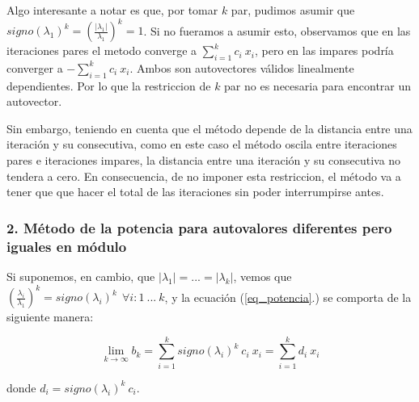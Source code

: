 \vspace{1em}
Algo interesante a notar es que, por tomar $k$ par, pudimos asumir que $signo(\lambda_1)^k = (\frac{|\lambda_{1}|}{\lambda_{1}})^k = 1$. Si no fueramos a asumir esto, observamos que en las iteraciones pares el metodo converge a $\sum_{i=1}^{k} c_i\ x_i$, pero en las impares podría converger a $-\sum_{i=1}^{k} c_i\ x_i$. Ambos son autovectores válidos linealmente dependientes. Por lo que la restriccion de $k$ par no es necesaria para encontrar un autovector.

Sin embargo, teniendo en cuenta que el método depende de la distancia entre una iteración y su consecutiva, como en este caso el método oscila entre iteraciones pares e iteraciones impares, la distancia entre una iteración y su consecutiva no tendera a cero. En consecuencia, de no imponer esta restriccion, el método va a tener que que hacer el total de las iteraciones sin poder interrumpirse antes. 










\vspace{2em}
\subsubsection*{2. Método de la potencia para autovalores diferentes pero iguales en módulo} 

Si suponemos, en cambio, que $|\lambda_1| = ... = |\lambda_k|$, vemos que $(\frac{\lambda_i}{\lambda_1})^k = signo(\lambda_i)^k\ \ \forall i: 1\ ...\ k$, y la ecuación (\ref{eq_potencia}.) se comporta de la siguiente manera:

\begin{equation*}
    \lim_{k \to \infty} b_k = \sum_{i=1}^{k} signo(\lambda_i)^k\ c_i\ x_i = \sum_{i=1}^{k} d_i\ x_i  
\end{equation*}

\vspace{1em}
\noindent donde $d_i = signo(\lambda_i)^k\ c_i$.



